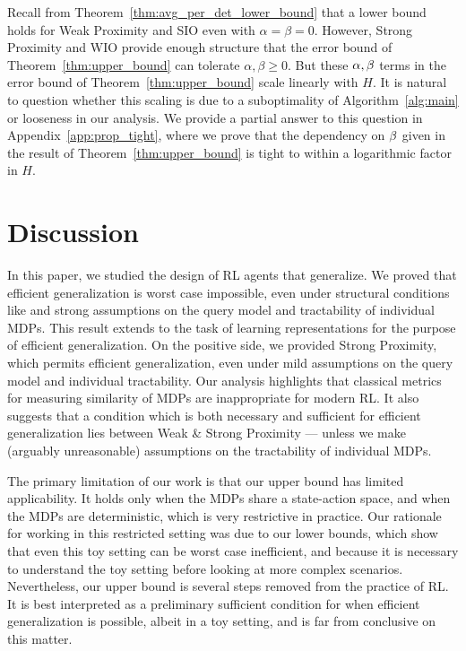 \documentclass[11pt,twoside]{article}
\begin{document}
Recall from Theorem~\ref{thm:avg_per_det_lower_bound} that a lower bound holds for Weak Proximity and SIO even with $\alpha = \beta = 0$. However, Strong Proximity and WIO provide enough structure that the error bound of Theorem~\ref{thm:upper_bound} can tolerate $\alpha, \beta \geq 0$. But these $\operatorname{\alpha}, \operatorname{\beta}$ terms in the error bound of Theorem~\ref{thm:upper_bound} scale linearly with $H$. It is natural to question whether this scaling is due to a suboptimality of Algorithm~\ref{alg:main} or looseness in our analysis. We provide a partial answer to this question in Appendix~\ref{app:prop_tight}, where we prove that the dependency on $\operatorname{\beta}$ given in the result of Theorem~\ref{thm:upper_bound} is tight to within a logarithmic factor in $H$.

\section{Discussion}
\label{sec:discussion}
In this paper, we studied the design of RL agents that generalize. We proved that efficient generalization is worst case impossible, even under structural conditions like \weakprox{} and strong assumptions on the query model and tractability of individual MDPs. This result extends to the task of learning representations for the purpose of efficient generalization. On the positive side, we provided Strong Proximity, which permits efficient generalization, even under mild assumptions on the query model and individual tractability. Our analysis highlights that classical metrics for measuring similarity of MDPs are inappropriate for modern RL. It also suggests that a condition which is both necessary and sufficient for efficient generalization lies between Weak \& Strong Proximity --- unless we make (arguably unreasonable) assumptions on the tractability of individual MDPs.

The primary limitation of our work is that our upper bound has limited applicability. It holds only when the MDPs share a state-action space, and when the MDPs are deterministic, which is very restrictive in practice. Our rationale for working in this restricted setting was due to our lower bounds, which show that even this toy setting can be worst case inefficient, and because it is necessary to understand the toy setting before looking at more complex scenarios. Nevertheless, our upper bound is several steps removed from the practice of RL. It is best interpreted as a preliminary sufficient condition for when efficient generalization is possible, albeit in a toy setting, and is far from conclusive on this matter.
\end{document}
